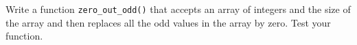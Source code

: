 Write a function \texttt{zero\_out\_odd()} that accepts an array of integers and the size of the array and then replaces all the odd values in the array by zero. Test your function.

